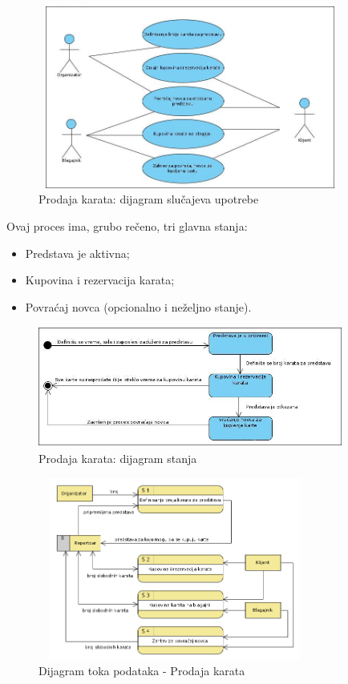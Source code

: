 \documentclass[a4paper]{article}
\begin{document}
\begin{figure}[H]
  \begin{center}
      \includegraphics[width=100mm,height=60mm]{../images/usecase_prodaja_karata.jpg}
  \end{center}
  \caption{Prodaja karata: dijagram slučajeva upotrebe}
  \label{usecase_prodaja_karata}
\end{figure}

Ovaj proces ima, grubo rečeno, tri glavna stanja:
\begin{itemize}
  \item Predstava je aktivna;
  \item Kupovina i rezervacija karata;
  \item Povraćaj novca (opcionalno i neželjno stanje).
\end{itemize}

\begin{figure}[H]
  \begin{center}
      \includegraphics[width=100mm,height=40mm]{../images/state_prodaja_karata.jpg}
  \end{center}
  \caption{Prodaja karata: dijagram stanja}
  \label{state_prodaja_karata}
\end{figure}

\begin{figure}[H]
  \begin{center}
      \includegraphics[width=90mm,height=60mm]{../images/dfd2_prodaja_karata.png}
  \end{center}
  \caption{Dijagram toka podataka - Prodaja karata}
  \label{dfd2_prodaja_karata}
\end{figure}
\end{document}

